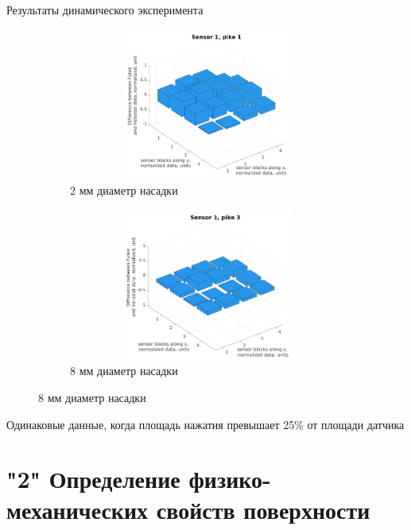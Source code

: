 \documentclass[aspectratio=169,xcolor=table,10pt]{beamer}
\begin{document}
\begin{frame}[t]{Результаты динамического эксперимента}
    \begin{figure}[H]
        \begin{subfigure}{0.49\textwidth}
            \centering\includegraphics[height=5cm,width=1\textwidth,keepaspectratio]{sens1_pike1.png}
            \caption*{2 мм диаметр насадки}
            \label{fig:sens1_pike1}
        \end{subfigure}
        \begin{subfigure}{0.49\textwidth}
            \centering\includegraphics[height=5cm,width=1\textwidth,keepaspectratio]{sens1_pike3.png}
            \caption*{8 мм диаметр насадки}
            \label{fig:sens1_pike3}
        \end{subfigure}
    \end{figure}
    \vspace{-0.8cm}
    \alert{Одинаковые данные, когда площадь нажатия превышает 25\% от площади датчика}
\end{frame}

\section{"2" Определение физико-механических свойств поверхности}
\end{document}

